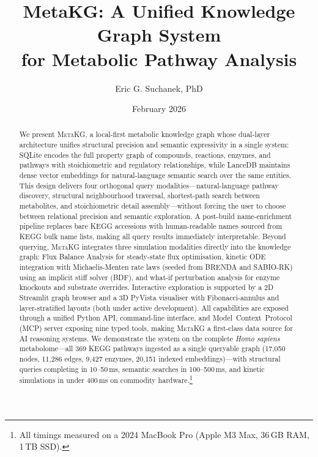 \documentclass[10pt]{article}
\title{\textbf{MetaKG: A Unified Knowledge Graph System\\for Metabolic Pathway Analysis}}
\author[1]{Eric G. Suchanek, PhD}
\affil[1]{Flux Frontiers, \href{https://github.com/Flux-Frontiers}{github.com/Flux-Frontiers}}
\date{February 2026}
\begin{document}

\maketitle

\begin{abstract}
\noindent
We present \textsc{MetaKG}, a local-first metabolic knowledge graph whose
dual-layer architecture unifies structural precision and semantic expressivity
in a single system: SQLite encodes the full property graph of compounds,
reactions, enzymes, and pathways with stoichiometric and regulatory
relationships, while LanceDB maintains dense vector embeddings for
natural-language semantic search over the same entities. This design delivers
four orthogonal query modalities---natural-language pathway discovery,
structural neighbourhood traversal, shortest-path search between metabolites,
and stoichiometric detail assembly---without forcing the user to choose between
relational precision and semantic exploration. A post-build name-enrichment
pipeline replaces bare KEGG accessions with human-readable names sourced from
KEGG bulk name lists, making all query results immediately interpretable.
Beyond querying, \textsc{MetaKG} integrates three simulation modalities
directly into the knowledge graph: Flux Balance Analysis for steady-state flux
optimisation, kinetic ODE integration with Michaelis-Menten rate laws (seeded
from BRENDA and SABIO-RK) using an implicit stiff solver (BDF), and what-if
perturbation analysis for enzyme knockouts and substrate overrides. Interactive
exploration is supported by a 2D Streamlit graph browser and a 3D PyVista
visualiser with Fibonacci-annulus and layer-stratified layouts (both under
active development). All capabilities are exposed through a unified Python API,
command-line interface, and Model~Context~Protocol (MCP) server exposing nine
typed tools, making \textsc{MetaKG} a first-class data source for AI reasoning
systems. We demonstrate the system on the complete \textit{Homo sapiens}
metabolome---all 369 KEGG pathways ingested as a single queryable graph
(17,050 nodes, 11,286 edges, 9,427 enzymes, 20,151 indexed embeddings)---with
structural queries completing in 10--50\,ms, semantic searches in
100--500\,ms, and kinetic simulations in under 400\,ms on commodity
hardware.\footnote{All timings measured on a 2024 MacBook Pro (Apple M3
Max, 36\,GB RAM, 1\,TB SSD).}
\end{abstract}
\end{document}
